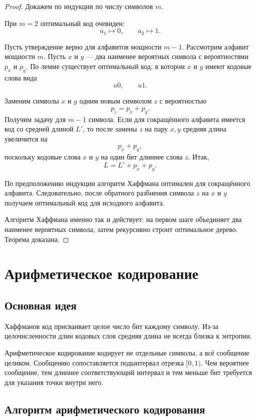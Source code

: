 \documentclass[12pt,a4paper]{article}
\begin{document}
\begin{proof}
Докажем по индукции по числу символов $m$.

При $m=2$ оптимальный код очевиден:
\[
    a_1\mapsto 0,\qquad a_2\mapsto 1.
\]

Пусть утверждение верно для алфавитов мощности $m-1$.
Рассмотрим алфавит мощности $m$.
Пусть $x$ и $y$ --- два наименее вероятных символа с вероятностями $p_x$ и $p_y$.
По лемме существует оптимальный код, в котором $x$ и $y$ имеют кодовые слова вида
\[
    u0,\qquad u1.
\]

Заменим символы $x$ и $y$ одним новым символом $z$ с вероятностью
\[
    p_z=p_x+p_y.
\]
Получим задачу для $m-1$ символа.
Если для сокращённого алфавита имеется код со средней длиной $L'$, то после замены $z$ на пару $x,y$ средняя длина увеличится на
\[
    p_x+p_y,
\]
поскольку кодовые слова $x$ и $y$ на один бит длиннее слова $z$.
Итак,
\[
    L = L' + p_x+p_y.
\]

По предположению индукции алгоритм Хаффмана оптимален для сокращённого алфавита.
Следовательно, после обратного разбиения символа $z$ на $x$ и $y$ получаем оптимальный код для исходного алфавита.

Алгоритм Хаффмана именно так и действует: на первом шаге объединяет два наименее вероятных символа, затем рекурсивно строит оптимальное дерево.
Теорема доказана.
\end{proof}

\section{Арифметическое кодирование}

\subsection{Основная идея}

Хаффманов код присваивает целое число бит каждому символу.
Из-за целочисленности длин кодовых слов средняя длина не всегда близка к энтропии.

Арифметическое кодирование кодирует не отдельные символы, а всё сообщение целиком.
Сообщению сопоставляется подынтервал отрезка $[0,1)$.
Чем вероятнее сообщение, тем длиннее соответствующий интервал и тем меньше бит требуется для указания точки внутри него.

\subsection{Алгоритм арифметического кодирования}
\end{document}

